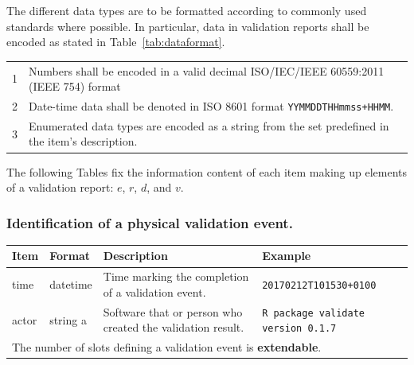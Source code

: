 \documentclass[a4paper, 11pt]{article}
\newcommand{\code}[1]{\texttt{#1}}
\begin{document}
The different data types are to be formatted according to commonly used
standards where possible. In particular, data in validation reports shall be
encoded as stated in Table~\ref{tab:dataformat}.
\begin{center}
\begin{tabular}{|lp{}|}
\hline
1&Numbers shall be encoded in a valid decimal ISO/IEC/IEEE 60559:2011 (IEEE 754) format \\
2&Date-time data shall be denoted in ISO 8601 format \code{YYMMDDTHHmmss+HHMM}. \\
3&Enumerated data types are encoded as a string from the set predefined in the item's description.\\
\hline
\end{tabular}
\label{tab:dataformat}
\end{center}

The following Tables fix the information content of each item making up elements of 
a validation report: $e$, $r$, $d$, and $v$.

\subsubsection{Identification of a physical validation event.}
%
\begin{center}
\begin{tabular}{|lp{15mm}p{}p{}|}
\hline
\textbf{Item} & \textbf{Format} & \textbf{Description} &\textbf{Example}\\
\hline
time          & datetime & Time marking the completion of a validation event. & \code{20170212T101530+0100}\\
actor         & string        a  & Software that or person who created the validation result. & \code{R package validate version 0.1.7}\\
\hline
\multicolumn{4}{|l|}{The number of slots defining a validation event is \textbf{extendable}.
}\\
\hline
\end{tabular}
\end{center}
\end{document}
